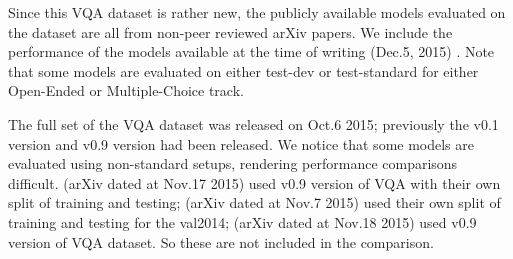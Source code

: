 \documentclass{article} %
\begin{document}
Since this VQA dataset is rather new, the publicly available models evaluated on the dataset are all from non-peer reviewed arXiv papers. We include the performance of the models available at the time of writing (Dec.5, 2015) \cite{antol2015vqa, jiang2015compositional, andreas2015deep, shih2015look,wu2015ask,noh2015image}. Note that some models are evaluated on either test-dev or test-standard for either Open-Ended or Multiple-Choice track. 

The full set of the VQA dataset was released on Oct.6 2015;  previously the v0.1 version and v0.9 version had been released. We notice that some models are evaluated using non-standard setups, rendering performance comparisons difficult. \cite{xu2015ask} (arXiv dated at Nov.17 2015) used v0.9 version of VQA with their own split of training and testing; \cite{yang2015stacked} (arXiv dated at Nov.7 2015) used their own split of training and testing for the val2014; \cite{chen2015abc} (arXiv dated at Nov.18 2015) used v0.9 version of VQA dataset. So these are not included in the comparison.
\end{document}
